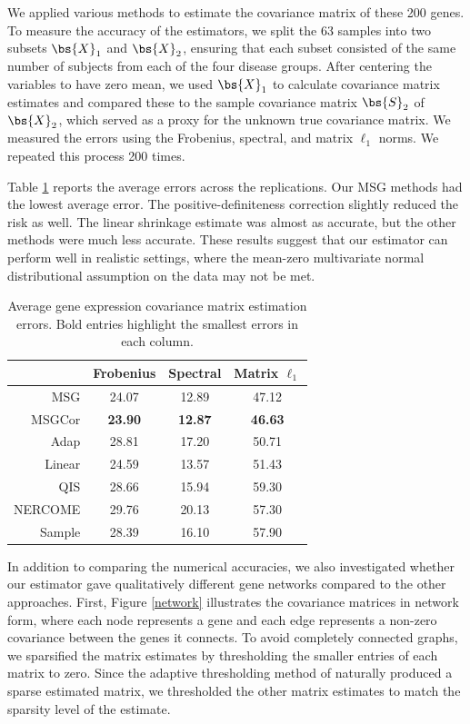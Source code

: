 We applied various methods to estimate the covariance matrix of these 200 genes. To measure the accuracy of the estimators, we split the 63 samples into two subsets $\bs{X}_1$ and $\bs{X}_2$, ensuring that each subset consisted of the same number of subjects from each of the four disease groups. After centering the variables to have zero mean, we used $\bs{X}_1$ to calculate covariance matrix estimates and compared these to the sample covariance matrix $\bs{S}_2$ of $\bs{X}_2$, which served as a proxy for the unknown true covariance matrix. We measured the errors using the Frobenius, spectral, and matrix $\ell_1$ norms. We repeated this process 200 times.

Table \ref{tab:tab1} reports the average errors across the replications. Our MSG methods had the lowest average error. The positive-definiteness correction slightly reduced the risk as well. The linear shrinkage estimate was almost as accurate, but the other methods were much less accurate. These results suggest that our estimator can perform well in realistic settings, where the mean-zero multivariate normal distributional assumption on the data may not be met.


\begin{table}
\centering
\setlength{\tabcolsep}{3pt} %
\begin{tabular}{rccc}
\hline
            & Frobenius & Spectral & Matrix $\ell_1$ \\
\hline
MSG   & 24.07          & 12.89         & 47.12         \\
MSGCor & \textbf{23.90} & \textbf{12.87}& \textbf{46.63}         \\
Adap        & 28.81          & 17.20         & 50.71         \\
Linear      & 24.59         & 13.57         & 51.43         \\
QIS         & 28.66          & 15.94         & 59.30         \\
NERCOME     & 29.76          & 20.13         & 57.30         \\
Sample      & 28.39          & 16.10         & 57.90         \\
\hline
\end{tabular}
\caption{\label{tab:tab1} Average gene expression covariance matrix estimation errors. Bold entries highlight the smallest errors in each column.}
\end{table}

In addition to comparing the numerical accuracies, we also investigated whether our estimator gave qualitatively different gene networks compared to the other approaches. First, Figure \ref{network} illustrates the covariance matrices in network form, where each node represents a gene and each edge represents a non-zero covariance between the genes it connects. To avoid completely connected graphs, we sparsified the matrix estimates by thresholding the smaller entries of each matrix to zero. Since the adaptive thresholding method of \citet{cai2011adaptive} naturally produced a sparse estimated matrix, we thresholded the other matrix estimates to match the sparsity level of the \citet{cai2011adaptive} estimate.

